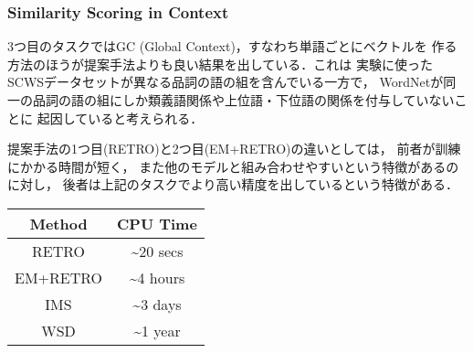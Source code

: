 \documentclass[10pt,hyperref={unicode}]{beamer}
\begin{document}
\begin{frame}
\frametitle{Similarity Scoring in Context}
3つ目のタスクではGC (Global Context)，すなわち単語ごとにベクトルを
作る方法のほうが提案手法よりも良い結果を出している．これは
実験に使ったSCWSデータセットが異なる品詞の語の組を含んでいる一方で，
WordNetが同一の品詞の語の組にしか類義語関係や上位語・下位語の関係を付与していないことに
起因していると考えられる．

\bigskip

提案手法の1つ目(RETRO)と2つ目(EM+RETRO)の違いとしては，
前者が訓練にかかる時間が短く，
また他のモデルと組み合わせやすいという特徴があるのに対し，
後者は上記のタスクでより高い精度を出しているという特徴がある．

        \begin{center}
            \begin{algfont}
                {\renewcommand{\arraystretch}{1.5}
                    {\scriptsize
                        \begin{tabular}{|c|c|}
                            \hline
                            Method & CPU Time \\
                            \hline
                            RETRO    & {\textasciitilde}20 secs \\
                            EM+RETRO & {\textasciitilde}4 hours \\
                            IMS      & {\textasciitilde}3 days  \\
                            WSD      & {\textasciitilde}1 year \\
                            \hline
                        \end{tabular}
                    }
                }
            \end{algfont}
        \end{center}
\end{frame}
\end{document}
